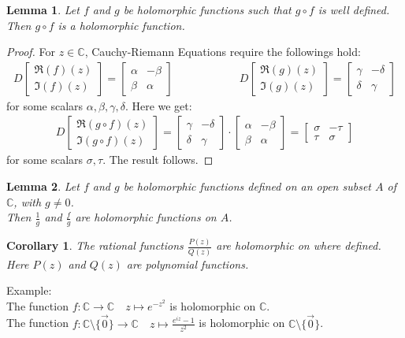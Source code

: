 \documentclass[15pt]{book}
\theoremstyle{break}
\theoremstyle{break}
\newtheorem{lem}{Lemma}[thm]
\newtheorem{corL}{Corollary}[lem]
\newcommand{\Complex}{\mathbb{C}}
\newcommand{\bmat}[1]{\begin{bmatrix} #1 \end{bmatrix}}
\newcommand{\example}{\color{green}Example: \color{black}}
\begin{document}
\newpage
\begin{lem}
Let $f$ and $g$ be holomorphic functions such that $g\circ f$ is well defined.\\ 
Then $g\circ f$ is a holomorphic function.
\end{lem}
\begin{proof}
For $z \in \Complex$, Cauchy-Riemann Equations require the followings hold:
\begin{align*}
D\bmat{\Re(f)(z) \\ \Im(f)(z)} = \bmat{\alpha &-\beta \\ \beta & \alpha} \qquad\qquad\qquad 
D\bmat{\Re(g)(z) \\ \Im(g)(z)} = \bmat{\gamma &-\delta \\ \delta & \gamma}
\end{align*}
for some scalars $\alpha,\beta,\gamma,\delta$. Here we get:
\begin{align*}
D\bmat{\Re(g\circ f)(z) \\ \Im(g\circ f)(z)} = \bmat{\gamma &-\delta \\ \delta & \gamma} \cdot \bmat{\alpha &-\beta \\ \beta & \alpha}  = \bmat{\sigma & -\tau \\ \tau & \sigma}
\end{align*}
for some scalars $\sigma,\tau$. The result follows.
\end{proof}

\begin{lem}
Let $f$ and $g$ be holomorphic functions defined on an open subset $A$ of $\Complex$, with $g\neq 0$. \\
Then $\frac{1}{g}$ and $\frac{f}{g}$ are holomorphic functions on $A$.
\end{lem}

\begin{corL}
The rational functions $\frac{P(z)}{Q(z)}$ are holomorphic on where defined. \\
Here $P(z)$ and $Q(z)$ are polynomial functions.
\end{corL}

\example \\
The function $f:\Complex \to \Complex  \quad z\mapsto e^{-z^2}$ is holomorphic on $\Complex$.\\
The function $f:\Complex \setminus \{\vec{0}\} \to \Complex  \quad z\mapsto \frac{e^{iz} -1}{z^2}$ is holomorphic on $\Complex \setminus \{\vec{0}\}$. 
\end{document}
